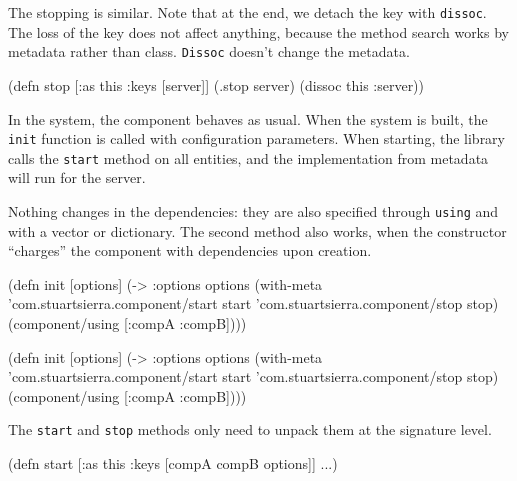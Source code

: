 The stopping is similar. Note that at the end, we detach the key with \verb|dissoc|. The loss of the key does not affect anything, because the method search works by metadata rather than class. \verb|Dissoc| doesn't change the metadata.

\begin{english}
  \begin{clojure}
(defn stop
  [{:as this :keys [server]}]
  (.stop server)
  (dissoc this :server))
  \end{clojure}
\end{english}

In the system, the component behaves as usual. When the system is built, the \verb|init| function is called with configuration parameters. When starting, the library calls the \verb|start| method on all entities, and the implementation from metadata will run for the server.

Nothing changes in the dependencies: they are also specified through \verb|using| and with a vector or dictionary. The second method also works, when the constructor ``charges'' the component with dependencies upon creation.

\ifnarrow

\begin{english}
  \begin{clojure}
(defn init [options]
  (->
    {:options options}
    (with-meta
     {'com.stuartsierra.component/start
      start
      'com.stuartsierra.component/stop
      stop})
    (component/using [:compA :compB])))
  \end{clojure}
\end{english}

\else

\begin{english}
  \begin{clojure}
(defn init [options]
  (-> {:options options}
      (with-meta
        {'com.stuartsierra.component/start start
         'com.stuartsierra.component/stop stop})
      (component/using [:compA :compB])))
  \end{clojure}
\end{english}

\fi

\noindent
The \verb|start| and \verb|stop| methods only need to unpack them at the signature level.

\ifnarrow

\begin{english}
  \begin{clojure}
(defn start
  [{:as this
    :keys [compA compB options]}]
  ...)
  \end{clojure}
\end{english}

